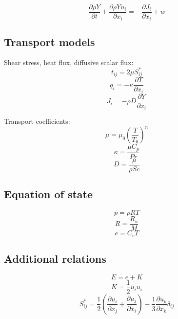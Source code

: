 \documentclass[oneside,a4paper,11pt]{report}
\begin{document}
\begin{equation}
    \frac{\partial\rho Y}{\partial t}+\frac{\partial \rho Y u_i}{\partial x_i} = -\frac{\partial J_i}{\partial x_i} + w
\end{equation}

\subsection{Transport models}
Shear stress, heat flux, diffusive scalar flux:
\begin{equation}
    t_{ij} = 2\mu S_{ij}^*
\end{equation}
\begin{equation}
    q_i = -\kappa \frac{\partial T}{\partial x_i}
\end{equation}
\begin{equation}
    J_i = -\rho D \frac{\partial Y}{\partial x_i}
\end{equation}

Transport coefficients:
\begin{equation}
    \mu = \mu_0 \left ( \frac{T}{T_0} \right )^n
\end{equation}
\begin{equation}
    \kappa = \frac{\mu C_p}{Pr}
\end{equation}
\begin{equation}
    D = \frac{\mu}{\rho Sc}
\end{equation}

\subsection{Equation of state}
\begin{equation}
    p = \rho R T
\end{equation}
\begin{equation}
    R = \frac{R_u}{M}
\end{equation}
\begin{equation}
    e = C_v T
\end{equation}

\subsection{Additional relations}
\begin{equation}
    E = e + K
\end{equation}
\begin{equation}
    K = \frac{1}{2} u_i u_i
\end{equation}
\begin{equation}
    S^*_{ij} = \frac{1}{2} \left ( \frac{\partial u_i}{\partial x_j} + \frac{\partial u_j}{\partial x_i} \right ) - \frac{1}{3} \frac{\partial u_k}{\partial x_k} \delta_{ij}
\end{equation}
\end{document}
